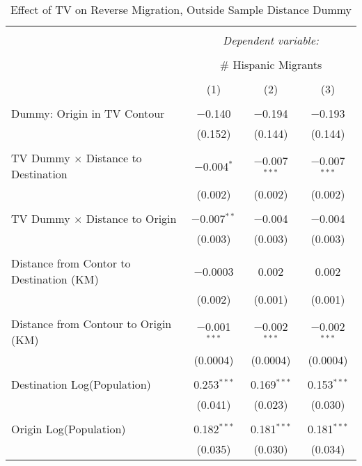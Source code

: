 
\begin{table}[!htbp] \centering 
  \caption{Effect of TV on Reverse Migration, Outside Sample Distance Dummy} 
  \label{} 
\begin{tabular}{@{\extracolsep{5pt}}lccc} 
\\[-1.8ex]\hline 
\hline \\[-1.8ex] 
 & \multicolumn{3}{c}{\textit{Dependent variable:}} \\ 
\cline{2-4} 
\\[-1.8ex] & \multicolumn{3}{c}{\# Hispanic Migrants} \\ 
\\[-1.8ex] & (1) & (2) & (3)\\ 
\hline \\[-1.8ex] 
 Dummy: Origin in TV Contour & $-$0.140 & $-$0.194 & $-$0.193 \\ 
  & (0.152) & (0.144) & (0.144) \\ 
  & & & \\ 
 TV Dummy $\times$ Distance to Destination & $-$0.004$^{*}$ & $-$0.007$^{***}$ & $-$0.007$^{***}$ \\ 
  & (0.002) & (0.002) & (0.002) \\ 
  & & & \\ 
 TV Dummy $\times$ Distance to Origin & $-$0.007$^{**}$ & $-$0.004 & $-$0.004 \\ 
  & (0.003) & (0.003) & (0.003) \\ 
  & & & \\ 
 Distance from Contor to Destination (KM) & $-$0.0003 & 0.002 & 0.002 \\ 
  & (0.002) & (0.001) & (0.001) \\ 
  & & & \\ 
 Distance from Contour to Origin (KM) & $-$0.001$^{***}$ & $-$0.002$^{***}$ & $-$0.002$^{***}$ \\ 
  & (0.0004) & (0.0004) & (0.0004) \\ 
  & & & \\ 
 Destination Log(Population) & 0.253$^{***}$ & 0.169$^{***}$ & 0.153$^{***}$ \\ 
  & (0.041) & (0.023) & (0.030) \\ 
  & & & \\ 
 Origin Log(Population) & 0.182$^{***}$ & 0.181$^{***}$ & 0.181$^{***}$ \\ 
  & (0.035) & (0.030) & (0.034) \\ 

\end{tabular}
\end{table}
